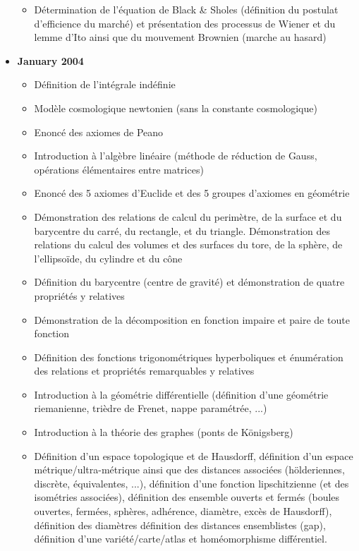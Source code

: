 \begin{itemize}
\begin{itemize}[noitemsep]
				\item Détermination de l'équation de Black \& Sholes (définition du postulat d'efficience du marché) et présentation des processus de Wiener et du lemme d'Ito ainsi que du mouvement Brownien (marche au hasard)
			\end{itemize}
		\item \textbf{January 2004}
			\begin{itemize}[noitemsep]
				\item Définition de l'intégrale indéfinie
				\item Modèle cosmologique newtonien (sans la constante cosmologique)
				\item Enoncé des axiomes de Peano
				\item Introduction à l'algèbre linéaire (méthode de réduction de Gauss, opérations élémentaires entre matrices)
				\item Enoncé des 5 axiomes d'Euclide et des 5 groupes d'axiomes en géométrie
				\item Démonstration des relations de calcul du perimètre, de la surface et du barycentre du carré, du rectangle, et du triangle. Démonstration des relations du calcul des volumes et des surfaces du tore, de la sphère, de l'ellipsoïde, du cylindre et du cône
				\item Définition du barycentre (centre de gravité) et démonstration de quatre propriétés y relatives
				\item Démonstration de la décomposition en fonction impaire et paire de toute fonction 
				\item Définition des fonctions trigonométriques hyperboliques et énumération des relations et propriétés remarquables y relatives
				\item Introduction à la géométrie différentielle (définition d'une géométrie riemanienne, trièdre de Frenet, nappe paramétrée, ...)
				\item Introduction à la théorie des graphes (ponts de Königsberg)
				\item Définition d'un espace topologique et de Hausdorff, définition d'un espace métrique/ultra-métrique ainsi que des distances associées (hölderiennes, discrète, équivalentes, ...), définition d'une fonction lipschitzienne (et des isométries associées), définition des ensemble ouverts et fermés (boules ouvertes, fermées, sphères, adhérence, diamètre, excès de Hausdorff), définition des diamètres définition des distances ensemblistes (gap), définition d'une variété/carte/atlas et homéomorphisme différentiel.

\end{itemize}
\end{itemize}
